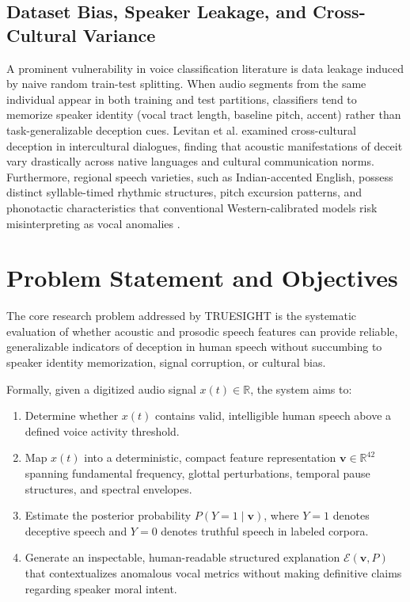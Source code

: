 \documentclass[conference]{IEEEtran}
\begin{document}
\subsection{Dataset Bias, Speaker Leakage, and Cross-Cultural Variance}
A prominent vulnerability in voice classification literature is data leakage induced by naive random train-test splitting. When audio segments from the same individual appear in both training and test partitions, classifiers tend to memorize speaker identity (vocal tract length, baseline pitch, accent) rather than task-generalizable deception cues. Levitan et al. \cite{levitan2018crosscultural} examined cross-cultural deception in intercultural dialogues, finding that acoustic manifestations of deceit vary drastically across native languages and cultural communication norms. Furthermore, regional speech varieties, such as Indian-accented English, possess distinct syllable-timed rhythmic structures, pitch excursion patterns, and phonotactic characteristics that conventional Western-calibrated models risk misinterpreting as vocal anomalies \cite{levitan2018crosscultural, santhosh2023indianaccent}.

\section{Problem Statement and Objectives}
The core research problem addressed by TRUESIGHT is the systematic evaluation of whether acoustic and prosodic speech features can provide reliable, generalizable indicators of deception in human speech without succumbing to speaker identity memorization, signal corruption, or cultural bias.

Formally, given a digitized audio signal $x(t) \in \mathbb{R}$, the system aims to:
\begin{enumerate}
    \item Determine whether $x(t)$ contains valid, intelligible human speech above a defined voice activity threshold.
    \item Map $x(t)$ into a deterministic, compact feature representation $\mathbf{v} \in \mathbb{R}^{42}$ spanning fundamental frequency, glottal perturbations, temporal pause structures, and spectral envelopes.
    \item Estimate the posterior probability $P(Y=1 \mid \mathbf{v})$, where $Y=1$ denotes deceptive speech and $Y=0$ denotes truthful speech in labeled corpora.
    \item Generate an inspectable, human-readable structured explanation $\mathcal{E}(\mathbf{v}, P)$ that contextualizes anomalous vocal metrics without making definitive claims regarding speaker moral intent.
\end{enumerate}
\end{document}
